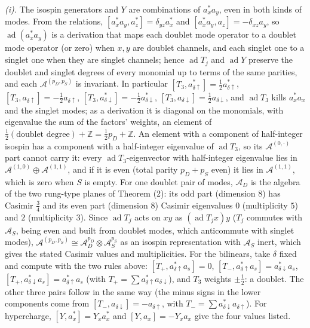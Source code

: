 \emph{(i).} The isospin generators and $Y$ are combinations of $a_{x}^{*}a_{y}$, even in both kinds of modes. From the relations, $[a_{x}^{*}a_{y}, a_{z}^{*}] = \delta_{yz}a_{x}^{*}$ and $[a_{x}^{*}a_{y}, a_{z}] = -\delta_{xz}a_{y}$, so $\operatorname{ad}(a_{x}^{*}a_{y})$ is a derivation that maps each doublet mode operator to a doublet mode operator (or zero) when $x, y$ are doublet channels, and each singlet one to a singlet one when they are singlet channels; hence $\operatorname{ad}T_{j}$ and $\operatorname{ad}Y$ preserve the doublet and singlet degrees of every monomial up to terms of the same parities, and each $\mathcal{A}^{(p_{D}, p_{S})}$ is invariant. In particular $[T_{3}, a_{\delta\uparrow}^{*}] = \tfrac12a_{\delta\uparrow}^{*}$, $[T_{3}, a_{\delta\uparrow}] = -\tfrac12a_{\delta\uparrow}$, $[T_{3}, a_{\delta\downarrow}^{*}] = -\tfrac12a_{\delta\downarrow}^{*}$, $[T_{3}, a_{\delta\downarrow}] = \tfrac12a_{\delta\downarrow}$, and $\operatorname{ad}T_{3}$ kills $a_{x}^{*}a_{x}$ and the singlet modes; as a derivation it is diagonal on the monomials, with eigenvalue the sum of the factors' weights, an element of $\tfrac12(\text{doublet degree}) + \mathbb{Z} = \tfrac12p_{D} + \mathbb{Z}$. An element with a component of half-integer isospin has a component with a half-integer eigenvalue of $\operatorname{ad}T_{3}$, so its $\mathcal{A}^{(0, \cdot)}$ part cannot carry it: every $\operatorname{ad}T_{3}$-eigenvector with half-integer eigenvalue lies in $\mathcal{A}^{(1, 0)} \oplus \mathcal{A}^{(1, 1)}$, and if it is even (total parity $p_{D} + p_{S}$ even) it lies in $\mathcal{A}^{(1, 1)}$, which is zero when $S$ is empty. For one doublet pair of modes, $\mathcal{A}_{D}$ is the algebra of the two rung-type planes of Theorem (2): its odd part (dimension $8$) has Casimir $\tfrac34$ and its even part (dimension $8$) Casimir eigenvalues $0$ (multiplicity $5$) and $2$ (multiplicity $3$). Since $\operatorname{ad}T_{j}$ acts on $xy$ as $(\operatorname{ad}T_{j}x)y$ ($T_{j}$ commutes with $\mathcal{A}_{S}$, being even and built from doublet modes, which anticommute with singlet modes), $\mathcal{A}^{(p_{D}, p_{S})} \cong \mathcal{A}_{D}^{p_{D}}\otimes\mathcal{A}_{S}^{p_{S}}$ as an isospin representation with $\mathcal{A}_{S}$ inert, which gives the stated Casimir values and multiplicities. For the bilinears, take $\delta$ fixed and compute with the two rules above: $[T_{+}, a_{\delta\uparrow}^{*}a_{s}] = 0$, $[T_{-}, a_{\delta\uparrow}^{*}a_{s}] = a_{\delta\downarrow}^{*}a_{s}$, $[T_{+}, a_{\delta\downarrow}^{*}a_{s}] = a_{\delta\uparrow}^{*}a_{s}$ (with $T_{+} = \sum a_{\delta\uparrow}^{*}a_{\delta\downarrow}$), and $T_{3}$ weights $\pm\tfrac12$: a doublet. The other three pairs follow in the same way (the minus signs in the lower components come from $[T_{-}, a_{\delta\downarrow}] = -a_{\delta\uparrow}$, with $T_{-} = \sum a_{\delta\downarrow}^{*}a_{\delta\uparrow}$). For hypercharge, $[Y, a_{x}^{*}] = Y_{x}a_{x}^{*}$ and $[Y, a_{x}] = -Y_{x}a_{x}$ give the four values listed.

